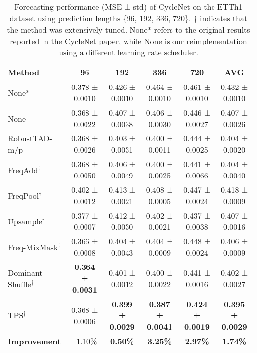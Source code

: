 \begin{table}[h!]
\centering
\renewcommand{\arraystretch}{1.3}
\begin{adjustbox}{max width=\textwidth}
\begin{tabular}{l|c|c|c|c||c}
\toprule
\textbf{Method} & \textbf{96} & \textbf{192} & \textbf{336} & \textbf{720} & \textbf{AVG} \\
\midrule
None*              & 0.378 ± 0.0010 & 0.426 ± 0.0010 & 0.464 ± 0.0010 & 0.461 ± 0.0010 & 0.432 ± 0.0010 \\
None               & 0.368 ± 0.0022 & 0.407 ± 0.0038 & 0.406 ± 0.0030 & 0.446 ± 0.0027 & 0.407 ± 0.0026 \\
RobustTAD-m/p    & 0.368 ± 0.0026 & 0.403 ± 0.0031 & 0.400 ± 0.0011 & 0.444 ± 0.0025 & 0.404 ± 0.0020 \\
FreqAdd$^\dagger$  & 0.368 ± 0.0050 & 0.406 ± 0.0049 & 0.400 ± 0.0025 & 0.441 ± 0.0066 & 0.404 ± 0.0040 \\
FreqPool$^\dagger$ & 0.402 ± 0.0012 & 0.413 ± 0.0021 & 0.408 ± 0.0005 & 0.447 ± 0.0024 & 0.418 ± 0.0009 \\
Upsample$^\dagger$ & 0.377 ± 0.0007 & 0.412 ± 0.0030 & 0.402 ± 0.0021 & \cellcolor{secondcolor} 0.437 ± 0.0038 & 0.407 ± 0.0016 \\
Freq-MixMask$^\dagger$ & \cellcolor{secondcolor}0.366 ± 0.0008 & 0.404 ± 0.0043 & 0.404 ± 0.0009 & 0.448 ± 0.0024 & 0.406 ± 0.0009 \\
Dominant Shuffle$^\dagger$  & \cellcolor{bestcolor} \textbf{0.364 ± 0.0031} & \cellcolor{secondcolor} 0.401 ± 0.0012 & \cellcolor{secondcolor} 0.400 ± 0.0022 & 0.441 ± 0.0016 & \cellcolor{secondcolor} 0.402 ± 0.0027 \\
TPS$^\dagger$           & 0.368 ± 0.0006 & \cellcolor{bestcolor} \textbf{0.399 ± 0.0029} & \cellcolor{bestcolor} \textbf{0.387 ± 0.0041} & \cellcolor{bestcolor} \textbf{0.424 ± 0.0019} & \cellcolor{bestcolor} \textbf{0.395 ± 0.0029} \\
\cmidrule(lr){1-6}
\textbf{Improvement} & \cellcolor{worstcolor} --1.10\% & \cellcolor{bestcolor} \textbf{0.50\%} & \cellcolor{bestcolor} \textbf{3.25\%} &  \cellcolor{bestcolor} \textbf{2.97\%} & \cellcolor{bestcolor} \textbf{1.74\%} \\
\bottomrule
\end{tabular}
\end{adjustbox}
\caption{Forecasting performance (MSE ± std) of CycleNet on the ETTh1 dataset using prediction lengths \{96, 192, 336, 720\}. $\dagger$ indicates that the method was extensively tuned. None* refers to the original results reported in the CycleNet paper, while None is our reimplementation using a different learning rate scheduler.}
\label{tab:cycle_etth1}
\end{table}

